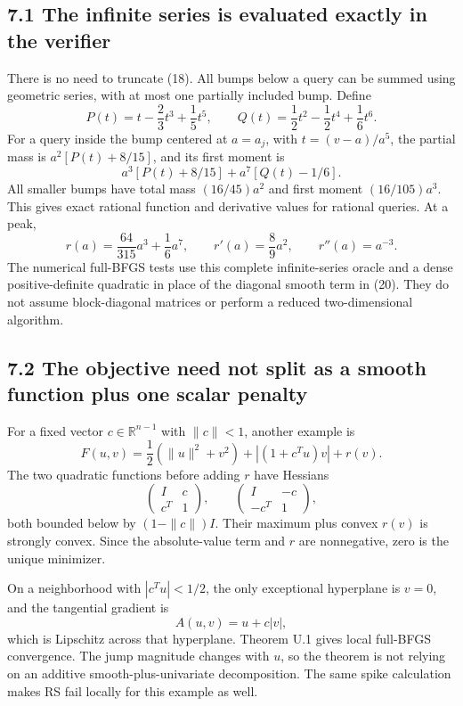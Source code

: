 \subsection{7.1 The infinite series is evaluated exactly in the
verifier}\label{U:the-infinite-series-is-evaluated-exactly-in-the-verifier}

There is no need to truncate (18). All bumps below a query can be summed
using geometric series, with at most one partially included bump. Define
\[
 P(t)=t-\frac23t^3+\frac15t^5,\qquad
 Q(t)=\frac12t^2-\frac12t^4+\frac16t^6.
\] For a query inside the bump centered at \(a=a_j\), with
\(t=(v-a)/a^5\), the partial mass is \(a^2[P(t)+8/15]\), and its first
moment is \[
 a^3[P(t)+8/15]+a^7[Q(t)-1/6].
\] All smaller bumps have total mass \((16/45)a^2\) and first moment
\((16/105)a^3\). This gives exact rational function and derivative
values for rational queries. At a peak, \[
 r(a)=\frac{64}{315}a^3+\frac16a^7,\qquad
 r'(a)=\frac89a^2,\qquad r''(a)=a^{-3}.
\] The numerical full-BFGS tests use this complete infinite-series
oracle and a dense positive-definite quadratic in place of the diagonal
smooth term in (20). They do not assume block-diagonal matrices or
perform a reduced two-dimensional algorithm.

\subsection{7.2 The objective need not split as a smooth function plus
one scalar
penalty}\label{U:the-objective-need-not-split-as-a-smooth-function-plus-one-scalar-penalty}

For a fixed vector \(c\in\mathbb R^{n-1}\) with \(\|c\|<1\), another
example is \[
 F(u,v)=\frac12(\|u\|^2+v^2)+|(1+c^Tu)v|+r(v).
\] The two quadratic functions before adding \(r\) have Hessians \[
 \begin{pmatrix}I&c\\c^T&1\end{pmatrix},\qquad
 \begin{pmatrix}I&-c\\-c^T&1\end{pmatrix},
\] both bounded below by \((1-\|c\|)I\). Their maximum plus convex
\(r(v)\) is strongly convex. Since the absolute-value term and \(r\) are
nonnegative, zero is the unique minimizer.

On a neighborhood with \(|c^Tu|<1/2\), the only exceptional hyperplane
is \(v=0\), and the tangential gradient is \[
 A(u,v)=u+c|v|,
\] which is Lipschitz across that hyperplane. Theorem U.1 gives local
full-BFGS convergence. The jump magnitude changes with \(u\), so the
theorem is not relying on an additive smooth-plus-univariate
decomposition. The same spike calculation makes RS fail locally for this
example as well.


\endgroup

